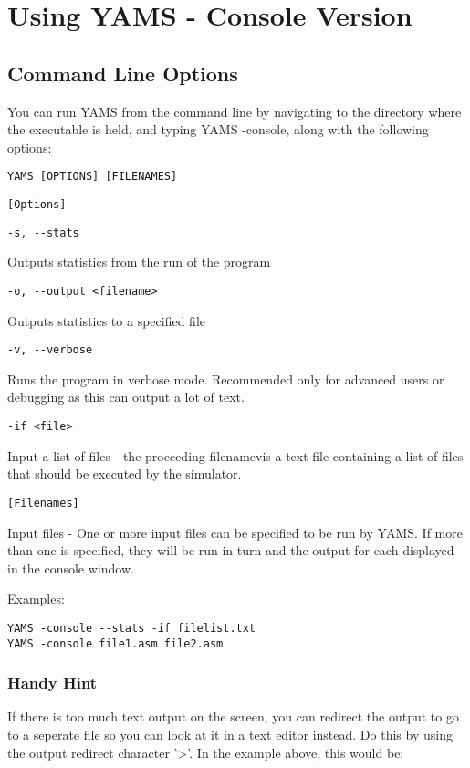 \section{Using YAMS - Console Version}
\subsection{Command Line Options}
You can run YAMS from the command line by navigating to the directory where the executable is held, and typing  YAMS -console, along with the following options:

\begin{verbatim}
YAMS [OPTIONS] [FILENAMES]
\end{verbatim}

\begin{verbatim}
[Options]
\end{verbatim}

\begin{verbatim}
-s, --stats
\end{verbatim}Outputs statistics from the run of the program

\begin{verbatim}
-o, --output <filename>
\end{verbatim}Outputs statistics to a specified file

\begin{verbatim}
-v, --verbose
\end{verbatim}Runs the program in verbose mode. Recommended only for advanced users or debugging as this can output a lot of text.

\begin{verbatim}
-if <file>	
\end{verbatim}Input a list of files - the proceeding filenamevis a text file containing a list of files that should be executed by the simulator.

\begin{verbatim}
[Filenames]
\end{verbatim}Input files - One or more input files can be specified to be run by YAMS. If more than one is specified, they will be run in turn and the output for each displayed in the console window.



Examples:
\begin{verbatim}
YAMS -console --stats -if filelist.txt
YAMS -console file1.asm file2.asm
\end{verbatim}

\subsubsection{Handy Hint}
If there is too much text output on the screen, you can redirect the output to go to a seperate file so you can look at it in a text editor instead. Do this by using the output redirect character '>'.  In the example above, this would be:

